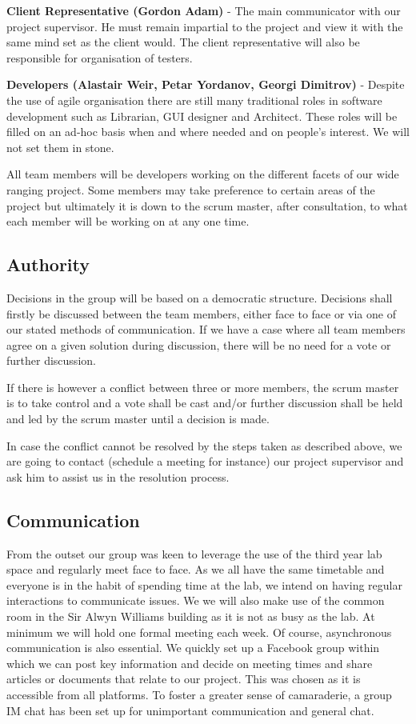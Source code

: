 \documentclass{l3proj}
\begin{document}
{\bf Client Representative (Gordon Adam)} - The main communicator with our project supervisor. He must remain impartial to the project and view it with the same mind set as the client would. The client representative will also be responsible for organisation of testers.

{\bf Developers (Alastair Weir, Petar Yordanov, Georgi Dimitrov)} - Despite the use of agile organisation there are still many traditional roles in software development such as Librarian, GUI designer and Architect.  These roles will be filled on an ad-hoc basis when and where needed and on people’s interest. We will not set them in stone.

All team members will be developers working on the different facets of our wide ranging project. Some members may take preference to certain areas of the project but ultimately it is down to the scrum master, after consultation, to what each member will be working on at any one time.

\subsection{Authority}Decisions in the group will be based on a democratic structure. Decisions shall firstly be discussed between the team members, either face to face or via one of our stated methods of communication. If we have a case where all team members agree on a given solution during discussion, there will be no need for a vote or further discussion.

If there is however a conflict between three or more members, the scrum master is to take control and a vote shall be cast and/or further discussion shall be held and led by the scrum master until a decision is made.

In case the conflict cannot be resolved by the steps taken as described above, we are going to contact (schedule a meeting for instance) our project supervisor and ask him to assist us in the resolution process.

\subsection{Communication}From the outset our group was keen to leverage the use of the third year lab space and regularly meet face to face. As we all have the same timetable and everyone is in the habit of spending time at the lab, we intend on having regular interactions to communicate issues. We we will also make use of the common room in the Sir Alwyn Williams building as it is not as busy as the lab. At minimum we will hold one formal meeting each week. Of course, asynchronous communication is also essential. We quickly set up a Facebook group within which we can post key information and decide on meeting times and share articles or documents that relate to our project. This was chosen as it is accessible from all platforms. To foster a greater sense of camaraderie, a group IM chat has been set up for unimportant communication and general chat.
\end{document}
